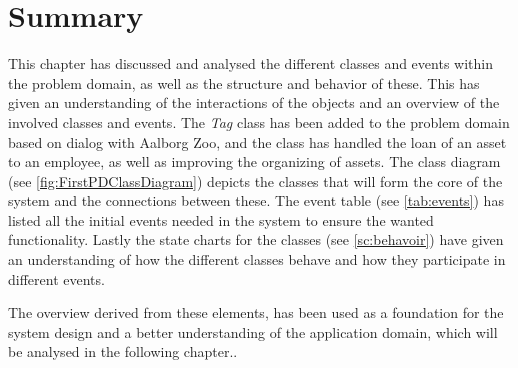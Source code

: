 \section{Summary} \label{ssc:pd_summary}
This chapter has discussed and analysed the different classes and events within the problem domain, as well as the structure and behavior of these. This has given an understanding of the interactions of the objects and an overview of the involved classes and events. The \textit{Tag} class has been added to the problem domain based on dialog with Aalborg Zoo, and the class has handled the loan of an asset to an employee, as well as improving the organizing of assets. The class diagram (see \autoref{fig:FirstPDClassDiagram}) depicts the classes that will form the core of the system and the connections between these. The event table (see \autoref{tab:events}) has listed all the initial events needed in the system to ensure the wanted functionality. Lastly the state charts for the classes (see \autoref{sc:behavoir}) have given an understanding of how the different classes behave and how they participate in different events.
\par

The overview derived from these elements, has been used as a foundation for the system design and a better understanding of the application domain, which will be analysed in the following chapter..\\